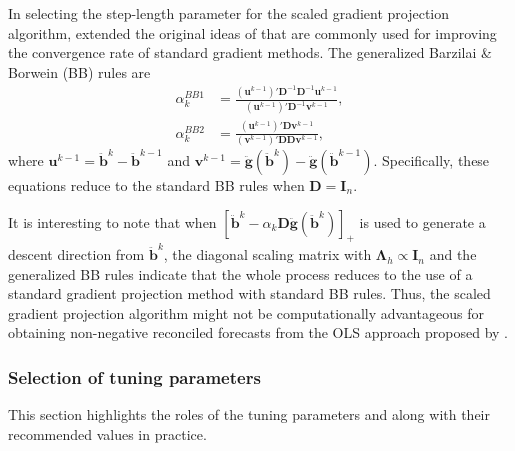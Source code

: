 \documentclass[11pt]{article}
\newcommand{\0}{\phantom{0}}
\begin{document}
In selecting the step-length parameter for the scaled gradient projection algorithm, \citet{Bonettini2009} extended the original ideas of \citet{Barzilai1988} that are commonly used for improving the convergence rate of standard gradient methods. The generalized Barzilai \& Borwein (BB) rules are
\begin{align*}
\alpha_{k}^{BB1} & = \frac{(\bm{u}^{k-1})'\bm{D}^{-1} \bm{D}^{-1} \bm{u}^{k-1}}{(\bm{u}^{k-1})'\bm{D}^{-1}\bm{v}^{k-1}},\\
\alpha_{k}^{BB2} & = \frac{(\bm{u}^{k-1})'\bm{D}\bm{v}^{k-1}}{(\bm{v}^{k-1})'\bm{D}\bm{D}\bm{v}^{k-1}},
\end{align*}
where $\bm{u}^{k-1} = \ddot{\bm{b}}^{k} - \ddot{\bm{b}}^{k-1}$ and $\bm{v}^{k-1} = \ddot{\bm{g}}(\ddot{\bm{b}}^{k}) - \ddot{\bm{g}}(\ddot{\bm{b}}^{k-1})$. Specifically, these equations reduce to the standard BB rules when $\bm{D} = \bm{I}_{n}$.

It is interesting to note that when $[\ddot{\bm{b}}^{k} - \alpha_{k} \bm{D} \ddot{\bm{g}}(\ddot{\bm{b}}^{k})]_{+}$ is used to generate a descent direction from $\ddot{\bm{b}}^{k}$, the diagonal scaling matrix with $\bm{\Lambda}_{h} \propto \bm{I}_{n}$ and the generalized BB rules indicate that the whole process reduces to the use of a standard gradient projection method with standard BB rules. Thus, the scaled gradient projection algorithm might not be computationally advantageous for obtaining non-negative reconciled forecasts from the OLS approach proposed by \citet{Hyndman2011}.

\subsubsection*{Selection of tuning parameters}

This section highlights the roles of the tuning parameters and along with their recommended values in practice.
\end{document}
